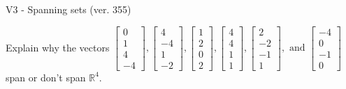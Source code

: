 \begin{exercise}
  \begin{exerciseTitle}V3 - Spanning sets (ver. 355)\end{exerciseTitle}
  \begin{exerciseStatement}
    Explain why the vectors \(\left[\begin{array}{r}
0 \\
1 \\
4 \\
-4
\end{array}\right] , \left[\begin{array}{r}
4 \\
-4 \\
1 \\
-2
\end{array}\right] , \left[\begin{array}{r}
1 \\
2 \\
0 \\
2
\end{array}\right] , \left[\begin{array}{r}
4 \\
4 \\
1 \\
1
\end{array}\right] , \left[\begin{array}{r}
2 \\
-2 \\
-1 \\
1
\end{array}\right] , \text{ and } \left[\begin{array}{r}
-4 \\
0 \\
-1 \\
0
\end{array}\right]\) span or don't span \(\mathbb{R}^4\). 
	



\end{exerciseStatement}
\end{exercise}
